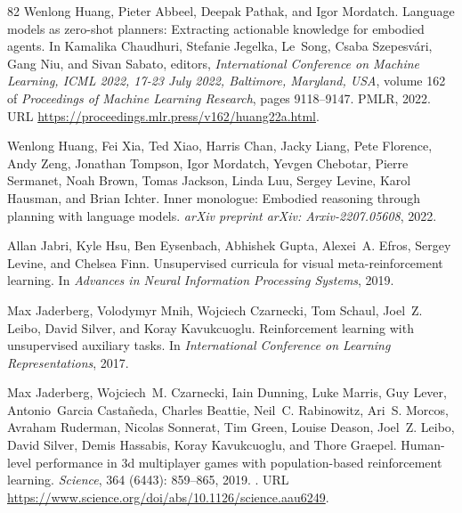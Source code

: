 \documentclass{article}
\begin{document}
\begin{thebibliography}{82}
Wenlong Huang, Pieter Abbeel, Deepak Pathak, and Igor Mordatch.
\newblock Language models as zero-shot planners: Extracting actionable knowledge for embodied agents.
\newblock In Kamalika Chaudhuri, Stefanie Jegelka, Le~Song, Csaba Szepesv{\'{a}}ri, Gang Niu, and Sivan Sabato, editors, \emph{International Conference on Machine Learning, {ICML} 2022, 17-23 July 2022, Baltimore, Maryland, {USA}}, volume 162 of \emph{Proceedings of Machine Learning Research}, pages 9118--9147. {PMLR}, 2022{}.
\newblock URL \url{https://proceedings.mlr.press/v162/huang22a.html}.

Wenlong Huang, Fei Xia, Ted Xiao, Harris Chan, Jacky Liang, Pete Florence, Andy Zeng, Jonathan Tompson, Igor Mordatch, Yevgen Chebotar, Pierre Sermanet, Noah Brown, Tomas Jackson, Linda Luu, Sergey Levine, Karol Hausman, and Brian Ichter.
\newblock Inner monologue: Embodied reasoning through planning with language models.
\newblock \emph{arXiv preprint arXiv: Arxiv-2207.05608}, 2022{}.

Allan Jabri, Kyle Hsu, Ben Eysenbach, Abhishek Gupta, Alexei~A. Efros, Sergey Levine, and Chelsea Finn.
\newblock Unsupervised curricula for visual meta-reinforcement learning.
\newblock In \emph{Advances in Neural Information Processing Systems}, 2019.

Max Jaderberg, Volodymyr Mnih, Wojciech Czarnecki, Tom Schaul, Joel~Z. Leibo, David Silver, and Koray Kavukcuoglu.
\newblock Reinforcement learning with unsupervised auxiliary tasks.
\newblock In \emph{International Conference on Learning Representations}, 2017.

Max Jaderberg, Wojciech~M. Czarnecki, Iain Dunning, Luke Marris, Guy Lever, Antonio~Garcia Castañeda, Charles Beattie, Neil~C. Rabinowitz, Ari~S. Morcos, Avraham Ruderman, Nicolas Sonnerat, Tim Green, Louise Deason, Joel~Z. Leibo, David Silver, Demis Hassabis, Koray Kavukcuoglu, and Thore Graepel.
\newblock Human-level performance in 3d multiplayer games with population-based reinforcement learning.
\newblock \emph{Science}, 364 (6443): 859--865, 2019.
\newblock {}.
\newblock URL \url{https://www.science.org/doi/abs/10.1126/science.aau6249}.


\end{thebibliography}
\end{document}
